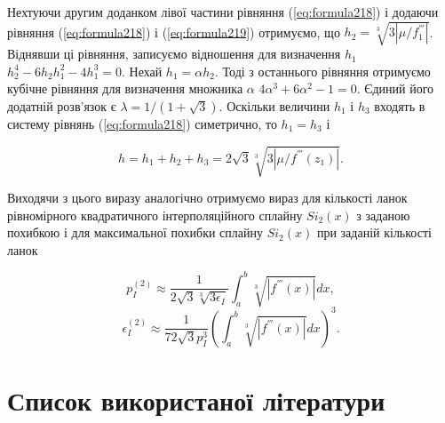 \documentclass[ukrainian,14pt]{extarticle}
\begin{document}
Нехтуючи другим доданком лівої частини рівняння (\ref{eq:formula218}) і додаючи рівняння (\ref{eq:formula218}) і (\ref{eq:formula219}) отримуємо, що $h_2 = \sqrt[3]{3|\mu/f^{'''}_1|}$. Віднявши ці рівняння, записуємо відношення для визначення $h_1$ $h_2^4 - 6h_2 h_1^2 - 4h_1^3 = 0$. Нехай $h_1 = \alpha h_2$. Тоді з останнього рівняння отримуємо кубічне рівняння для визначення множника $\alpha$ $4\alpha^3 + 6\alpha^2 - 1 = 0$. Єдиний його додатній розв'язок є $\lambda = 1 / (1 + \sqrt{3})$. Оскільки величини $h_1$ і $h_3$ входять в систему рівнянь (\ref{eq:formula218}) симетрично, то $h_1 = h_3$ і 

$$h = h_1 + h_2 + h_3 = 2 \sqrt{3} \sqrt[3]{3|\mu/f^{'''}(z_1)|}.$$

Виходячи з цього виразу аналогічно отримуємо вираз для кількості ланок рівномірного квадратичного інтерполяційного сплайну $Si_2(x)$ з заданою похибкою і для максимальної похибки сплайну $Si_2(x)$ при заданій кількості ланок

$$p_I^{(2)} \approx \frac{1}{2\sqrt{3} \sqrt[3]{3\epsilon_I}} \int_a^b \sqrt[3]{|f^{'''}(x)|}dx,$$
$$\epsilon_I^{(2)} \approx \frac{1}{72 \sqrt{3} p_I^{3}} \left(\int_a^b \sqrt[3]{|f^{'''}(x)|}dx \right)^3.$$


\newpage

\section*{Список використаної літератури}
\end{document}
